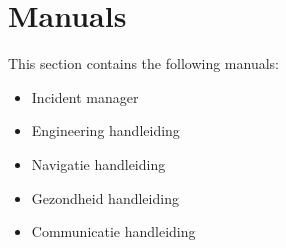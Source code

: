 \section{Manuals}
This section contains the following manuals:
\begin{itemize}
    \item Incident manager
    \item Engineering handleiding
    \item Navigatie handleiding
    \item Gezondheid handleiding
    \item Communicatie handleiding
\end{itemize}

\clearpage
% 

\setcounter{page}{1}

\clearpage
\setcounter{page}{1}

\clearpage
\setcounter{page}{1}

\clearpage
\setcounter{page}{1}

\clearpage
\setcounter{page}{1}
